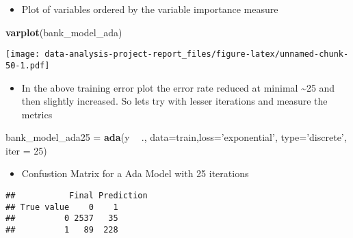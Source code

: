 \documentclass[
]{article}
\newenvironment{Shaded}{\begin{snugshade}}{\end{snugshade}}
\newcommand{\DataTypeTok}[1]{\textcolor[rgb]{0.13,0.29,0.53}{#1}}
\newcommand{\DecValTok}[1]{\textcolor[rgb]{0.00,0.00,0.81}{#1}}
\newcommand{\KeywordTok}[1]{\textcolor[rgb]{0.13,0.29,0.53}{\textbf{#1}}}
\newcommand{\NormalTok}[1]{#1}
\newcommand{\OperatorTok}[1]{\textcolor[rgb]{0.81,0.36,0.00}{\textbf{#1}}}
\newcommand{\StringTok}[1]{\textcolor[rgb]{0.31,0.60,0.02}{#1}}
\providecommand{\tightlist}{%
  \setlength{\itemsep}{0pt}\setlength{\parskip}{0pt}}
\begin{document}
\begin{itemize}
\tightlist
\item
  Plot of variables ordered by the variable importance measure
\end{itemize}

\begin{Shaded}
\begin{Highlighting}[]
\KeywordTok{varplot}\NormalTok{(bank_model_ada)}
\end{Highlighting}
\end{Shaded}

\texttt{[image: data-analysis-project-report\_files/figure-latex/unnamed-chunk-50-1.pdf]}

\begin{itemize}
\tightlist
\item
  In the above training error plot the error rate reduced at minimal
  \textasciitilde25 and then slightly increased. So lets try with lesser
  iterations and measure the metrics
\end{itemize}

\begin{Shaded}
\begin{Highlighting}[]
\NormalTok{bank_model_ada25 =}\StringTok{ }\KeywordTok{ada}\NormalTok{(y }\OperatorTok{~}\StringTok{ }\NormalTok{., }\DataTypeTok{data=}\NormalTok{train,}\DataTypeTok{loss=}\StringTok{'exponential'}\NormalTok{, }\DataTypeTok{type=}\StringTok{'discrete'}\NormalTok{, }\DataTypeTok{iter =} \DecValTok{25}\NormalTok{)}
\end{Highlighting}
\end{Shaded}

\begin{itemize}
\tightlist
\item
  Confustion Matrix for a Ada Model with 25 iterations
\end{itemize}

\begin{Shaded}
\end{Shaded}

\begin{verbatim}
##           Final Prediction
## True value    0    1
##          0 2537   35
##          1   89  228
\end{verbatim}

\begin{Shaded}
\end{Shaded}
\end{document}
